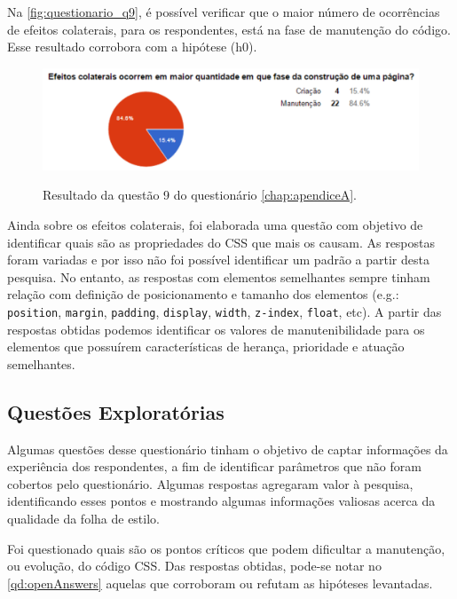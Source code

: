 Na \autoref{fig:questionario_q9}, é possível verificar que o maior número de ocorrências de efeitos colaterais, para os respondentes, está na fase de manutenção do código. Esse resultado corrobora com a hipótese (h0).

\begin{figure}[!htb]
	\centering
	\caption{Resultado da questão 9 do questionário \autoref{chap:apendiceA}.}
	\includegraphics[width=1\textwidth]{./04-figuras/questionario_q9}
	\label{fig:questionario_q9}
\end{figure}

Ainda sobre os efeitos colaterais, foi elaborada uma questão com objetivo de identificar quais são as propriedades do CSS que mais os causam. As respostas foram variadas e por isso não foi possível identificar um padrão a partir desta pesquisa. No entanto, as respostas com elementos semelhantes sempre tinham relação com definição de posicionamento e tamanho dos elementos (e.g.: \texttt{position}, \texttt{margin}, \texttt{padding}, \texttt{display}, \texttt{width}, \texttt{z-index}, \texttt{float}, etc). A partir das respostas obtidas podemos identificar os valores de manutenibilidade para os elementos que possuírem características de herança, prioridade e atuação semelhantes.

\subsection{Questões Exploratórias}

Algumas questões desse questionário tinham o objetivo de captar informações da experiência dos respondentes, a fim de identificar parâmetros que não foram cobertos pelo questionário. Algumas respostas agregaram valor à pesquisa, identificando esses pontos e mostrando algumas informações valiosas acerca da qualidade da folha de estilo. 

Foi questionado quais são os pontos críticos que podem dificultar a manutenção, ou evolução, do código CSS. Das respostas obtidas, pode-se notar no \autoref{qd:openAnswers} aquelas que corroboram ou refutam as hipóteses levantadas.

